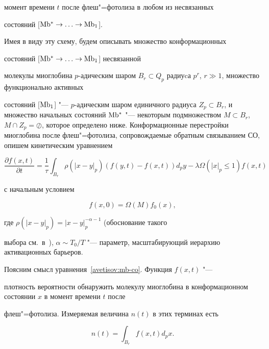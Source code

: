 момент времени $t$ после флеш"=фотолиза в любом из несвязанных

состояний [${\rm Mb^{*}}\to\ldots\to{\rm Mb_{1}}$].



Имея в виду эту схему, будем описывать множество конформационных

состояний [${\rm Mb^{*}}\to\ldots\to{\rm Mb_{1}}$] несвязанной

молекулы миоглобина $p$-адическим шаром $B_{r}\subset Q_{p}$ радиуcа $p^{r}$, $r\gg 1$, множество функционально активных

состояний [${\rm Mb_{1}}$] "--- $p$-адическим шаром единичного радиуса $Z_{p}\subset B_{r}$, и множество начальных состояний ${\rm Mb^{*}}$ "--- некоторым подмножеством $M\subset B_{r}$, $M\cap Z_p=\oslash$, которое определено ниже. Конформационные перестройки миоглобина после флеш"=фотолиза, сопровождаемые обратным связыванием СО, опишем кинетическим уравнением

\begin{equation}

\frac{\partial f(x,t)}{\partial

t}=\dfrac{1}{\tau}\int_{B_{r}}\rho(|x-y|_{p})(f(y,t)-f(x,t))d_{p}y-\lambda\Omega\left(|x|_{p}\leq1\right)f(x,t)

\label{avetisov:mb-co}

\end{equation}

с начальным условием

\[

f(x, 0)=\Omega(M)f_{0}(x),

\]

где $\rho(|x-y|_{p})=|x-y|_p^{-\alpha-1}$ (обоснование такого

выбора см.~в~\cite{avetisov_bikulov_zubarev:bib:ABKO,avetisov_bikulov_zubarev:bib:ABO}), \linebreak $\alpha\sim T_0/T$  "--- параметр, масштабирующий иерархию активационных барьеров.



Поясним смысл уравнения~\eqref{avetisov:mb-co}. Функция $f(x,t)$ "---

плотность вероятности обнаружить молекулу миоглобина в конформационном состоянии $x$ в момент времени $t$ после

флеш"=фотолиза. Измеряемая величина $n(t)$ в этих терминах есть

\begin{equation}

n(t)=\int_{B_{r}}f(x,t)d_{p}x.

\label{avetisov:S(t)}

\end{equation}

